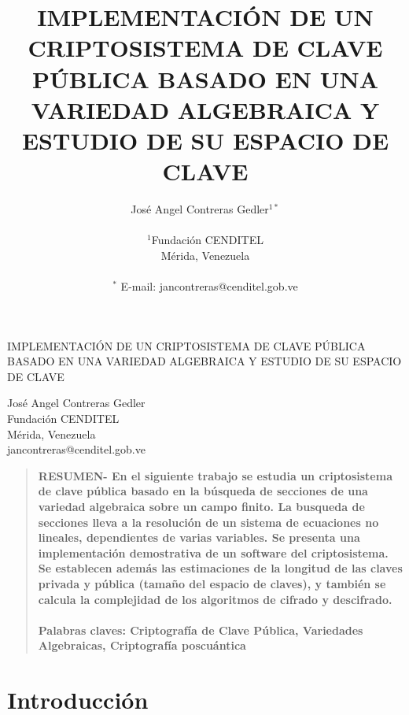 \documentclass[12pt]{article}
\title{IMPLEMENTACI\'ON DE UN CRIPTOSISTEMA DE CLAVE P\'UBLICA BASADO EN UNA VARIEDAD ALGEBRAICA Y ESTUDIO DE SU ESPACIO DE CLAVE}
\author
{Jos\'e Angel Contreras Gedler$^{1\ast}$\\
\\
\normalsize{$^{1}$Fundaci\'on CENDITEL}\\
\normalsize{M\'erida, Venezuela}\\
\\
\normalsize{$^\ast$ E-mail:  jancontreras@cenditel.gob.ve}
}
\date{}
\newenvironment{sciabstract}{%
\begin{quote} \bf}
{\end{quote}}
\begin{document}
 
\pagestyle{fancy}
\headheight=60pt %
\begin{center}


{\large IMPLEMENTACI\'ON DE UN CRIPTOSISTEMA DE CLAVE P\'UBLICA BASADO EN UNA VARIEDAD ALGEBRAICA Y ESTUDIO DE SU ESPACIO DE CLAVE}
\vspace*{1.2cm}



Jos\'e Angel Contreras Gedler\\

\normalsize{Fundaci\'on CENDITEL}\\
\normalsize{M\'erida, Venezuela}\\

\normalsize{ jancontreras@cenditel.gob.ve}



\end{center}
\begin{sciabstract}
  RESUMEN-  En el siguiente trabajo se estudia un criptosistema de clave p\'ublica basado en la b\'usqueda de secciones de una variedad algebraica  sobre un campo finito. La busqueda de secciones lleva a la resoluci\'on de un sistema de ecuaciones no lineales, dependientes de varias variables. Se presenta una implementaci\'on demostrativa de un software del criptosistema. Se establecen adem\'as las estimaciones de la longitud de las claves privada y p\'ublica (tama\~no del espacio de claves), y tambi\'en se calcula la complejidad de los algoritmos de cifrado y descifrado.
\\ \\
Palabras claves: Criptograf\'ia de Clave P\'ublica, Variedades Algebraicas, Criptografía poscu\'antica
\end{sciabstract}


\section*{Introducci\'on}
\noindent
\end{document}
